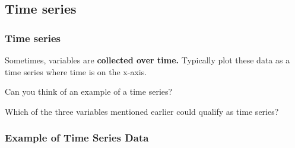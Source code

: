 \documentclass[handout]{beamer}
\begin{document}
% 
% 
% 
% 
% 
% 
% 
% 
% 
% 


\subsection{Time series}
\begin{frame}
\frametitle{Time series}
Sometimes, variables are \textbf{collected over time.}
\pause
Typically plot these data as a \alert{time series} where time is on the x-axis.

\vspace{0.25cm} \pause

Can you think of an example of a time series?

\pause

Which of the three variables mentioned earlier could qualify as time series?
\end{frame}




\begin{frame}
\frametitle{Example of Time Series Data}
\begin{center}
\end{center}
\end{frame}
\end{document}
